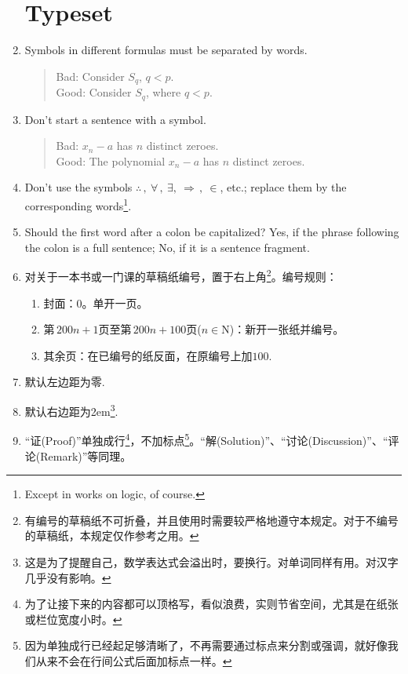 \documentclass[11pt, a4paper, titlepage]{article}
\begin{document}
\begin{enumerate}
\part{Typeset}
\item Symbols in different formulas must be separated by words.
    \begin{quote}
    Bad: Consider $S_{q}$, $q < p$.\\
    Good: Consider $S_{q}$, where $q < p$.
    \end{quote}

\item Don't start a sentence with a symbol.
    \begin{quote}
    Bad: $x_{n} - a$ has $n$ distinct zeroes.\\
    Good: The polynomial $x_{n} - a$ has $n$ distinct zeroes.
    \end{quote}

\item Don't use the symbols $\therefore\, , \ \forall\, , \ \exists, \ \Rightarrow\, , \ \in$, etc.; replace them by the corresponding words\footnote{Except in works on logic, of course.}.

\item Should the first word after a colon be capitalized? Yes, if the phrase following the colon is a full sentence; No, if it is a sentence fragment.

\item 对关于一本书或一门课的草稿纸编号，置于右上角\footnote{有编号的草稿纸不可折叠，并且使用时需要较严格地遵守本规定。对于不编号的草稿纸，本规定仅作参考之用。}。编号规则：
    \begin{enumerate}[label=(\Roman*)]
        \item 封面：0。单开一页。
        \item 第$\, 200n+1$页至第$\, 200n+100$页($n\in \mathrm{N}$)：新开一张纸并编号。
        \item 其余页：在已编号的纸反面，在原编号上加$100$.
    \end{enumerate}

\item 默认左边距为零.

\item 默认右边距为2em\footnote{这是为了提醒自己，数学表达式会溢出时，要换行。对单词同样有用。对汉字几乎没有影响。}.

\item “证(Proof)”单独成行\footnote{为了让接下来的内容都可以顶格写，看似浪费，实则节省空间，尤其是在纸张或栏位宽度小时。}，不加标点\footnote{因为单独成行已经起足够清晰了，不再需要通过标点来分割或强调，就好像我们从来不会在行间公式后面加标点一样。}。“解(Solution)”、“讨论(Discussion)”、“评论(Remark)”等同理。


\end{enumerate}
\end{document}
